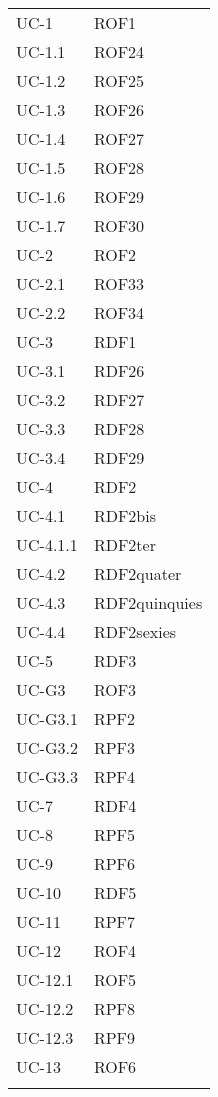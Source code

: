 \begin{longtable}{| p{5cm} | p{5cm} |}
		UC-1 & ROF1  \\
		\rowcolor{LightGray}
		UC-1.1 & ROF24 \\
		UC-1.2 & ROF25 \\
		\rowcolor{LightGray}
		UC-1.3 & ROF26 \\
		UC-1.4 & ROF27 \\
		\rowcolor{LightGray}
		UC-1.5 & ROF28 \\
		UC-1.6 & ROF29 \\
		\rowcolor{LightGray}
		UC-1.7 & ROF30 \\		
		UC-2 & ROF2 \\
		\rowcolor{LightGray}
		UC-2.1 & ROF33 \\
		UC-2.2 & ROF34 \\
		\rowcolor{LightGray}
		UC-3 & RDF1 \\
		UC-3.1 & RDF26 \\
		\rowcolor{LightGray}
		UC-3.2 & RDF27 \\
		UC-3.3 & RDF28 \\
		\rowcolor{LightGray}
		UC-3.4 & RDF29 \\
		UC-4 & RDF2 \\
		\rowcolor{LightGray}
		UC-4.1 & RDF2bis\\
		UC-4.1.1 & RDF2ter\\
		UC-4.2 & RDF2quater\\
		UC-4.3 & RDF2quinquies\\
		UC-4.4 & RDF2sexies\\
		\rowcolor{LightGray}
		UC-5 & RDF3 \\
		UC-G3 & ROF3 \\
		\rowcolor{LightGray}
		UC-G3.1 & RPF2 \\
		\rowcolor{LightGray}
		UC-G3.2 & RPF3 \\
		UC-G3.3 & RPF4 \\
		\rowcolor{LightGray}
		UC-7 & RDF4 \\
		UC-8 & RPF5 \\
		\rowcolor{LightGray}
		UC-9 & RPF6 \\
		UC-10 & RDF5 \\
		\rowcolor{LightGray}
		UC-11 & RPF7 \\
		UC-12 & ROF4 \\
		\rowcolor{LightGray}
		UC-12.1 & ROF5 \\
		UC-12.2 & RPF8 \\
		\rowcolor{LightGray}
		UC-12.3 & RPF9 \\
		UC-13 & ROF6 \\
		\rowcolor{LightGray}

\end{longtable}

